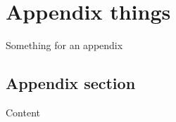 \chapter{Appendix things} \label{ch:app:addcode}
\newpage
\doublespacing
Something for an appendix

\section{Appendix section}
Content
